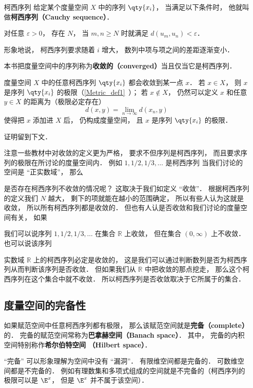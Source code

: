 

\begin{definition}{柯西序列}
给定某个度量空间 $X$ 中的序列 $\qty{x_i}$， 当满足以下条件时， 他就叫做\textbf{柯西序列（Cauchy sequence）}．

对任意 $\varepsilon > 0$， 存在 $N$， 当 $m, n \geqslant N$ 时就满足 $d(u_m, u_n) < \varepsilon$．
\end{definition}

形象地说， 柯西序列要求随着 $i$ 增大， 数列中项与项之间的差距逐渐变小．

\begin{definition}{}\label{cauchy_def1}
本书把度量空间中的序列称为\textbf{收敛的（converged）}当且仅当它是柯西序列．
\end{definition}

\begin{theorem}{}
度量空间 $X$ 中的任意柯西序列 $\qty{x_i}$ 都会收敛到某一点 $x$． 若 $x \in X$， 则 $x$ 是序列 $\qty{x_i}$ 的极限（\autoref{Metric_def1}~）； 若 $x \notin X$， 仍然可以定义 $x$ 和任意 $y\in X$ 的距离为（极限必定存在）
\begin{equation}
d(x, y) = \lim_{n\to\infty} d(x_n, y)
\end{equation}
使得把 $x$ 添加进 $X$ 后， 仍构成度量空间， 且 $x$ 是序列 $\qty{x_i}$ 的极限．
\end{theorem}
证明留到下文．


注意一些教材中对收敛的定义更为严格， 要求不但序列是柯西序列， 而且要求序列的极限在所讨论的度量空间内． 例如 $1, 1/2, 1/3, \dots$ 是柯西序列    当我们讨论的空间是 “正实数域”， 那么



是否存在柯西序列不收敛的情况呢？ 这取决于我们如定义 “收敛”． 根据柯西序列的定义我们 $N$ 越大， 剩下的项就能在越小的范围确定， 所以有些人认为这就是收敛， 所以所有柯西序列都是收敛的． 但也有人认是否收敛和我们讨论的度量空间有关， 如果
\begin{example}{}
我们可以说序列 $1, 1/2, 1/3, \dots$ 在集合 $\mathbb R$ 上收敛， 但在集合 $(0, \infty)$ 上不收敛． 也可以说该序列
\end{example}

实数域 $\mathbb R$ 上的柯西序列必定是收敛的， 这是我们可以通过判断数列是否为柯西序列从而判断该序列是否收敛． 但如果我们从 $\mathbb R$ 中把收敛的那点挖走， 那么这个柯西序列在这个集合中就不收敛． 所以柯西序列是否收敛取决于它所属于的集合． %

\subsection{度量空间的完备性}
如果赋范空间中任意柯西序列都有极限， 那么该赋范空间就是\textbf{完备（complete）}的． 完备的赋范空间常称为\textbf{巴拿赫空间（Banach space）}． 其中， 完备的内积空间特别称作\textbf{希尔伯特空间 （Hilbert space）}．

“完备” 可以形象理解为空间中没有 “漏洞”． 有限维空间都是完备的． 可数维空间都是不完备的． 例如有理数集和多项式组成的空间就是不完备的（柯西序列的极限可以是 $\E^x$， 但是 $\E^x$ 并不属于该空间）．
